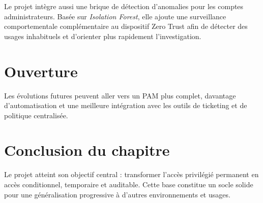 Le projet intègre aussi une brique de détection d'anomalies pour les comptes administrateurs. Basée sur \textit{Isolation Forest}, elle ajoute une surveillance comportementale complémentaire au dispositif Zero Trust afin de détecter des usages inhabituels et d'orienter plus rapidement l'investigation.

\section{Ouverture}
Les évolutions futures peuvent aller vers un PAM plus complet, davantage d'automatisation et une meilleure intégration avec les outils de ticketing et de politique centralisée.

\section{Conclusion du chapitre}
Le projet atteint son objectif central : transformer l'accès privilégié permanent en accès conditionnel, temporaire et auditable. Cette base constitue un socle solide pour une généralisation progressive à d'autres environnements et usages.
